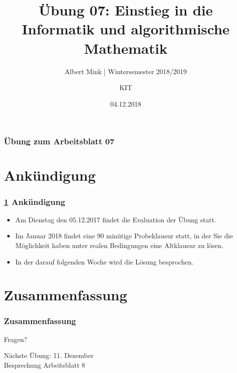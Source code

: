 \documentclass[c,18pt]{beamer}
\date{04.12.2018}
\title[Übung 07: Einstieg in die Informatik und algorithmische Mathematik]
  {Übung 07: Einstieg in die Informatik und algorithmische Mathematik}
\subtitle{Albert Mink | Wintersemester 2018/2019}
\author[Albert Mink, ]{KIT}
\institute[Institut für Angewandte und Numerische Mathematik (IANM)]{Institut für Angewandte und Numerische Mathematik}
\begin{document}
\begin{frame}
  \maketitle
\end{frame}

\begin{frame}
  \frametitle{Übung zum Arbeitsblatt 07}%
\tableofcontents[hideallsubsections]
\end{frame}

\def\kap{0}
\section{Ank\"undigung}\label{K:ank}
\begin{frame}
  \frametitle{\ref{K:ank} Ank\"undigung}%

\begin{itemize}
\item Am Dienstag den 05.12.2017 findet die Evaluation der \"Ubung statt.
\item Im Januar 2018 findet eine 90 min\"utige Probeklausur statt, in der Sie die M\"oglichkeit haben unter realen Bedingungen eine Altklausur zu l\"osen.
\item In der darauf folgenden Woche wird die L\"osung besprochen.
\end{itemize}

\end{frame}


\def\kap{2}
\setcounter{exercise}{27}
\setcounter{exercise}{28}
\setcounter{exercise}{29}
\setcounter{exercise}{30}

\section{Zusammenfassung}
\begin{frame}
  \frametitle{Zusammenfassung}%
\tableofcontents[hideallsubsections]
\end{frame}

\begin{frame}
\centering
\Huge\textcolor{KITgreen}{Fragen?}
\vspace{2cm}

{\LARGE
N\"achste \"Ubung: 11. Dezember\\
Besprechung Arbeitsblatt 8
}
\end{frame}


\end{document}
